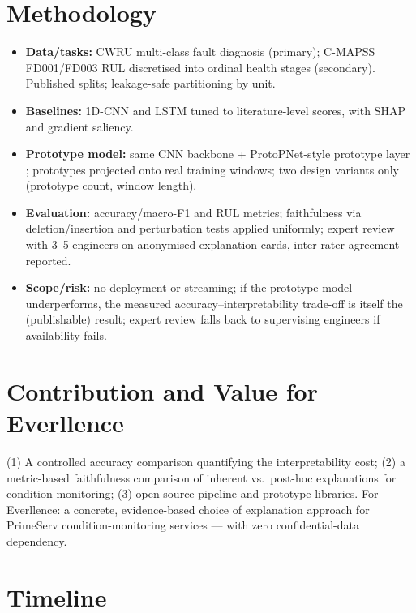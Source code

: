 \documentclass[10pt,a4paper]{article}
\begin{document}
\section{Methodology}

\begin{itemize}
    \item \textbf{Data/tasks:} CWRU multi-class fault diagnosis (primary); C-MAPSS FD001/FD003 RUL discretised into ordinal health stages (secondary). Published splits; leakage-safe partitioning by unit.
    \item \textbf{Baselines:} 1D-CNN \cite{li2018rul} and LSTM tuned to literature-level scores, with SHAP \cite{lundberg2017shap} and gradient saliency.
    \item \textbf{Prototype model:} same CNN backbone + ProtoPNet-style prototype layer \cite{chen2019protopnet}; prototypes projected onto real training windows; two design variants only (prototype count, window length).
    \item \textbf{Evaluation:} accuracy/macro-F1 and RUL metrics; faithfulness via deletion/insertion and perturbation tests applied uniformly; expert review with 3--5 engineers on anonymised explanation cards, inter-rater agreement reported.
    \item \textbf{Scope/risk:} no deployment or streaming; if the prototype model underperforms, the measured accuracy--interpretability trade-off is itself the (publishable) result; expert review falls back to supervising engineers if availability fails.
\end{itemize}

\section{Contribution and Value for Everllence}

(1) A controlled accuracy comparison quantifying the interpretability cost; (2) a metric-based faithfulness comparison of inherent vs.\ post-hoc explanations for condition monitoring; (3) open-source pipeline and prototype libraries. For Everllence: a concrete, evidence-based choice of explanation approach for PrimeServ condition-monitoring services --- with zero confidential-data dependency.

\section{Timeline}
\end{document}
